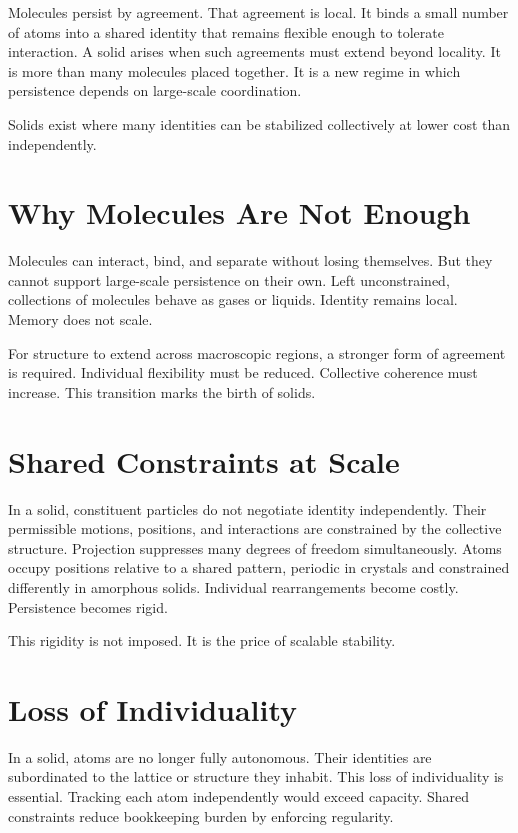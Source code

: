 \documentclass[11pt,twoside,openright]{book}
\begin{document}
Molecules persist by agreement. That agreement is local. It binds a small number of atoms into a shared identity that remains flexible enough to tolerate interaction. A solid arises when such agreements must extend beyond locality. It is more than many molecules placed together. It is a new regime in which persistence depends on large-scale coordination.

Solids exist where many identities can be stabilized collectively at lower cost than independently.

\section*{Why Molecules Are Not Enough}

Molecules can interact, bind, and separate without losing themselves. But they cannot support large-scale persistence on their own. Left unconstrained, collections of molecules behave as gases or liquids. Identity remains local. Memory does not scale.

For structure to extend across macroscopic regions, a stronger form of agreement is required. Individual flexibility must be reduced. Collective coherence must increase. This transition marks the birth of solids.

\section*{Shared Constraints at Scale}

In a solid, constituent particles do not negotiate identity independently. Their permissible motions, positions, and interactions are constrained by the collective structure. Projection suppresses many degrees of freedom simultaneously. Atoms occupy positions relative to a shared pattern, periodic in crystals and constrained differently in amorphous solids. Individual rearrangements become costly. Persistence becomes rigid.

This rigidity is not imposed. It is the price of scalable stability.

\section*{Loss of Individuality}

In a solid, atoms are no longer fully autonomous. Their identities are subordinated to the lattice or structure they inhabit. This loss of individuality is essential. Tracking each atom independently would exceed capacity. Shared constraints reduce bookkeeping burden by enforcing regularity.
\end{document}
